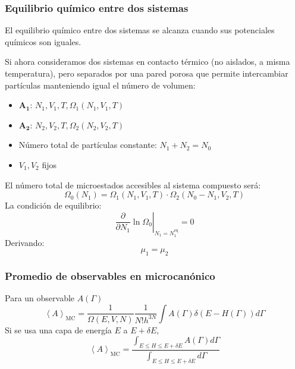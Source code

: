 \documentclass[]{article}
\numberwithin{equation}{section}
\newcommand{\0}{\textcolor{gray}{0}}
\begin{document}
\subsubsection{Equilibrio químico entre dos sistemas}
El equilibrio químico entre dos sistemas se alcanza cuando sus potenciales químicos son iguales.

Si ahora consideramos dos sistemas en contacto térmico (no aislados, a misma temperatura), pero separados por una pared porosa que permite intercambiar partículas manteniendo igual el número de volumen:
\begin{itemize}
	\item \(\mathbf{A_1}\): \(N_1, V_1, T, \Omega_1(N_1,V_1,T)\)
	\item \(\mathbf{A_2}\): \(N_2, V_2, T, \Omega_2(N_2,V_2,T)\)
	\item Número total de partículas constante: \(N_1 + N_2 = N_0\)
	\item \(V_1, V_2\) fijos
\end{itemize}
El número total de microestados accesibles al sistema compuesto será:
\begin{equation*}
	\Omega_0(N_1) = \Omega_1(N_1,V_1,T)\cdot\Omega_2(N_0-N_1,V_2,T)
\end{equation*}
La condición de equilibrio:
\begin{equation*}
	\left. \frac{\partial}{\partial N_1}\ln{\Omega_0}\right|_{N_1 = N_1^{\text{eq}}} = 0
\end{equation*}
Derivando:
\begin{equation}
	\mu_1 = \mu_2
\end{equation}

\subsubsection{Promedio de observables en microcanónico}
Para un observable \(A(\Gamma)\)
\begin{equation}
	\left\langle A\right\rangle_{\text{MC}} = \frac{1}{\Omega(E,V,N)}\frac{1}{N!h^{3N}} \int A(\Gamma)\delta(E-H(\Gamma))d\Gamma
\end{equation}
Si se usa una capa de energía \(E\) a \(E + \delta E\),
\begin{equation}
	\left\langle A\right\rangle_{\text{MC}} = \dfrac{\int_{E\leq H\leq E+\delta E} A(\Gamma)d\Gamma}{\int_{E\leq H\leq E+\delta E}d\Gamma}
\end{equation}
\end{document}
